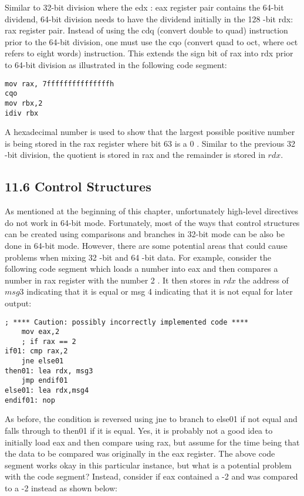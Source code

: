 \documentclass[10pt]{article}
\begin{document}
Similar to 32-bit division where the edx : eax register pair contains the 64-bit dividend, 64-bit division needs to have the dividend initially in the 128 -bit rdx:\\
rax register pair. Instead of using the cdq (convert double to quad) instruction prior to the 64-bit division, one must use the cqo (convert quad to oct, where oct refers to eight words) instruction. This extends the sign bit of rax into rdx prior to 64-bit division as illustrated in the following code segment:

\begin{verbatim}
mov rax, 7fffffffffffffffh
cqo
mov rbx,2
idiv rbx
\end{verbatim}

A hexadecimal number is used to show that the largest possible positive number is being stored in the rax register where bit 63 is a 0 . Similar to the previous 32 -bit division, the quotient is stored in rax and the remainder is stored in $r d x$.

\subsection*{11.6 Control Structures}
As mentioned at the beginning of this chapter, unfortunately high-level directives do not work in 64-bit mode. Fortunately, most of the ways that control structures can be created using comparisons and branches in 32-bit mode can be also be done in 64-bit mode. However, there are some potential areas that could cause problems when mixing 32 -bit and 64 -bit data. For example, consider the following code segment which loads a number into eax and then compares a number in rax register with the number 2 . It then stores in $r d x$ the address of $m s g 3$ indicating that it is equal or msg 4 indicating that it is not equal for later output:

\begin{verbatim}
; **** Caution: possibly incorrectly implemented code ****
    mov eax,2
    ; if rax == 2
if01: cmp rax,2
    jne else01
then01: lea rdx, msg3
    jmp endif01
else01: lea rdx,msg4
endif01: nop
\end{verbatim}

As before, the condition is reversed using jne to branch to else01 if not equal and falls through to then01 if it is equal. Yes, it is probably not a good idea to initially load eax and then compare using rax, but assume for the time being that the data to be compared was originally in the eax register. The above code segment works okay in this particular instance, but what is a potential problem with the code segment? Instead, consider if eax contained a -2 and was compared to a -2 instead as shown below:
\end{document}
